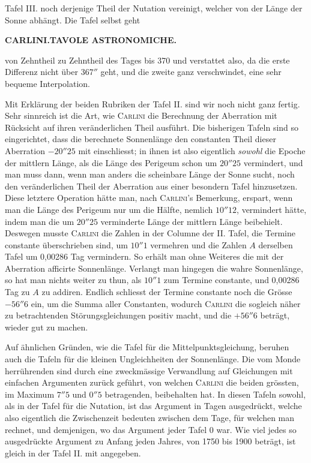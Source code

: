 Tafel III. noch derjenige Theil der Nutation vereinigt, welcher von der Länge der Sonne abhängt. Die Tafel selbst geht\par
\clearpage
\noindent{}%
\makebox[12mm][l]{}%
\parbox[t]{\dimexpr\linewidth-24mm\relax}{\centering\footnotesize\bfseries CARLINI.\enspace TAVOLE ASTRONOMICHE.\par}%
\par\nobreak\medskip
\noindent von Zehntheil zu Zehntheil des Tages bis 370 und verstattet also, da die erste Differenz nicht über $367''$ geht, und die zweite ganz verschwindet, eine sehr bequeme Interpolation.

Mit Erklärung der beiden Rubriken der Tafel II. sind wir noch nicht ganz fertig. Sehr sinnreich ist die Art, wie \textsc{Carlini} die Berechnung der Aberration mit Rücksicht auf ihren veränderlichen Theil ausführt. Die bisherigen Tafeln sind so eingerichtet, dass die berechnete Sonnenlänge den constanten Theil dieser Aberration $-20''25$ mit einschliesst; in ihnen ist also eigentlich \emph{sowohl} die Epoche der mittlern Länge, als die Länge des Perigeum schon um $20''25$ vermindert, und man muss dann, wenn man anders die scheinbare Länge der Sonne sucht, noch den veränderlichen Theil der Aberration aus einer besondern Tafel hinzusetzen. Diese letztere Operation hätte man, nach \textsc{Carlini}'s Bemerkung, erspart, wenn man die Länge des Perigeum nur um die Hälfte, nemlich $10''12$, vermindert hätte, indem man die um $20''25$ verminderte Länge der mittlern Länge beibehielt. Deswegen musste \textsc{Carlini} die Zahlen in der Columne der II. Tafel, die Termine constante überschrieben sind, um $10''1$ vermehren und die Zahlen $A$ derselben Tafel um 0,00286 Tag vermindern. So erhält man ohne Weiteres die mit der Aberration afficirte Sonnenlänge. Verlangt man hingegen die wahre Sonnenlänge, so hat man nichts weiter zu thun, als $10''1$ zum Termine constante, und 0,00286 Tag zu $A$ zu addiren. Endlich schliesst der Termine constante noch die Grösse $-56''6$ ein, um die Summa aller Constanten, wodurch \textsc{Carlini} die sogleich näher zu betrachtenden Störungsgleichungen positiv macht, und die $+56''6$ beträgt, wieder gut zu machen.

Auf ähnlichen Gründen, wie die Tafel für die Mittelpunktsgleichung, beruhen auch die Tafeln für die kleinen Ungleichheiten der Sonnenlänge. Die vom Monde herrührenden sind durch eine zweckmässige Verwandlung auf Gleichungen mit einfachen Argumenten zurück geführt, von welchen \textsc{Carlini} die beiden grössten, im Maximum $7''5$ und $0''5$ betragenden, beibehalten hat. In diesen Tafeln sowohl, als in der Tafel für die Nutation, ist das Argument in Tagen ausgedrückt, welche also eigentlich die Zwischenzeit bedeuten zwischen dem Tage, für welchen man rechnet, und demjenigen, wo das Argument jeder Tafel 0 war. Wie viel jedes so ausgedrückte Argument zu Anfang jeden Jahres, von 1750 bis 1900 beträgt, ist gleich in der Tafel II. mit angegeben.

